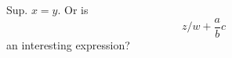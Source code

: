 \documentclass[reqno]{amsart} 
\begin{document}
Sup.  $x = y$.  Or is
\begin{equation*}
z / w + \frac{a}{b}c
\end{equation*}
an interesting expression?

{} 
\end{document}
